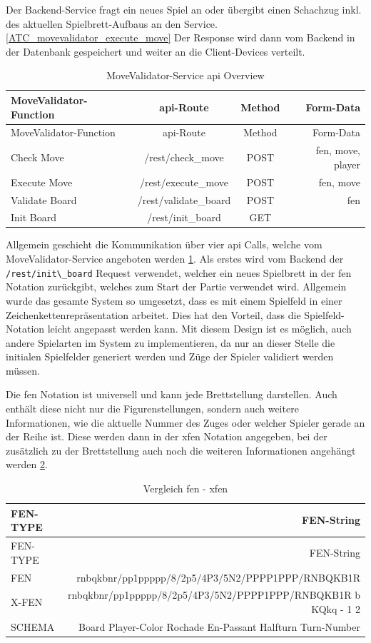 Der Backend-Service fragt ein neues Spiel an oder übergibt einen
Schachzug inkl. des aktuellen Spielbrett-Aufbaus an den
Service.\ref{ATC_movevalidator_execute_move} Der Response wird dann vom
Backend in der Datenbank gespeichert und weiter an die Client-Devices
verteilt.

\begin{longtable}[]{@{}lccr@{}}
\caption{MoveValidator-Service \gls{api} Overview
\label{finalfeaturesatc}}\tabularnewline
\toprule
MoveValidator-Function & \gls{api}-Route & Method &
Form-Data\tabularnewline
\midrule
\endfirsthead
\toprule
MoveValidator-Function & \gls{api}-Route & Method &
Form-Data\tabularnewline
\midrule
\endhead
Check Move & /rest/check\_move & POST & fen, move, player\tabularnewline
Execute Move & /rest/execute\_move & POST & fen, move\tabularnewline
Validate Board & /rest/validate\_board & POST & fen\tabularnewline
Init Board & /rest/init\_board & GET &\tabularnewline
\bottomrule
\end{longtable}

Allgemein geschieht die Kommunikation über vier \gls{api} Calls, welche
vom MoveValidator-Service angeboten werden \ref{finalfeaturesatc}. Als
erstes wird vom Backend der \passthrough{\lstinline!/rest/init\_board!}
Request verwendet, welcher ein neues Spielbrett in der \gls{fen}
Notation zurückgibt, welches zum Start der Partie verwendet wird.
Allgemein wurde das gesamte System so umgesetzt, dass es mit einem
Spielfeld in einer Zeichenkettenrepräsentation arbeitet. Dies hat den
Vorteil, dass die Spielfeld-Notation leicht angepasst werden kann. Mit
diesem Design ist es möglich, auch andere Spielarten im System zu
implementieren, da nur an dieser Stelle die initialen Spielfelder
generiert werden und Züge der Spieler validiert werden müssen.

Die \gls{fen} Notation ist universell und kann jede Brettstellung
darstellen. Auch enthält diese nicht nur die Figurenstellungen, sondern
auch weitere Informationen, wie die aktuelle Nummer des Zuges oder
welcher Spieler gerade an der Reihe ist. Diese werden dann in der
\gls{xfen} Notation angegeben, bei der zusätzlich zu der Brettstellung
auch noch die weiteren Informationen angehängt werden \ref{fenxfen}.

\begin{longtable}[]{@{}lr@{}}
\caption{Vergleich \gls{fen} - \gls{xfen}
\label{fenxfen}}\tabularnewline
\toprule
FEN-TYPE & FEN-String\tabularnewline
\midrule
\endfirsthead
\toprule
FEN-TYPE & FEN-String\tabularnewline
\midrule
\endhead
FEN & rnbqkbnr/pp1ppppp/8/2p5/4P3/5N2/PPPP1PPP/RNBQKB1R\tabularnewline
X-FEN & rnbqkbnr/pp1ppppp/8/2p5/4P3/5N2/PPPP1PPP/RNBQKB1R b KQkq - 1
2\tabularnewline
SCHEMA & Board Player-Color Rochade En-Passant Halfturn
Turn-Number\tabularnewline
\bottomrule
\end{longtable}

